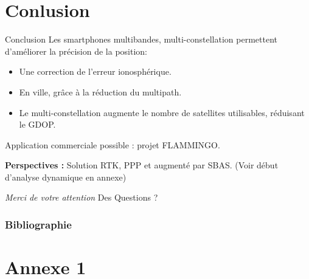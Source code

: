 \documentclass[xcolor=dvipsnames,envcountsect]{beamer}
\makeatletter
\let\beamer@writeslidentry@miniframeson=\beamer@writeslidentry
\def\beamer@writeslidentry@miniframesoff{%
  \expandafter\beamer@ifempty\expandafter{\beamer@framestartpage}{}%
  {%
    \clearpage\beamer@notesactions%
  }
}
\newcommand*{\miniframeson}{\let\beamer@writeslidentry=\beamer@writeslidentry@miniframeson}
\newcommand*{\miniframesoff}{\let\beamer@writeslidentry=\beamer@writeslidentry@miniframesoff}
\makeatother
\begin{document}
\section{Conlusion}
\begin{frame}{Conclusion}
	Les smartphones multibandes, multi-constellation permettent d'améliorer la précision de la position:
	\begin{itemize}
		\item Une correction de l'erreur ionosphérique.
		\item En ville, grâce à la réduction du multipath.
		\item Le multi-constellation augmente le nombre de satellites utilisables, réduisant le GDOP.
	\end{itemize}
	Application commerciale possible : projet FLAMMINGO.
	\newline

	\textbf{Perspectives :} Solution RTK, PPP et augmenté par SBAS.\newline
	{\small (Voir début d'analyse dynamique en annexe)}
	\newline

\end{frame}

\miniframesoff
\begin{frame}
	\centering
	\begin{block}
		\scshape
			\begin{center}
				{\Huge\emph{Merci de votre attention}} \newline
				\large Des Questions ?
			\end{center}
	\end{block}
\end{frame}

\miniframeson
\appendix
\begin{frame}[allowframebreaks]
	\frametitle{Bibliographie}
	\printbibliography
\end{frame}

\section{Annexe 1}
	
\end{document}
